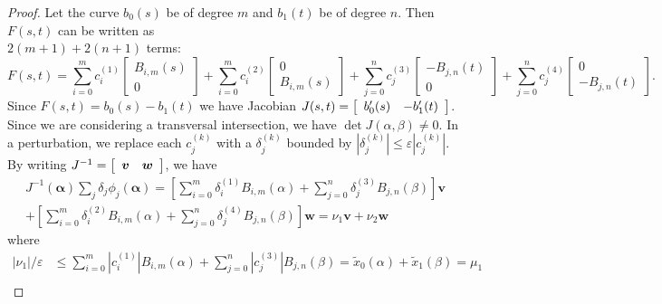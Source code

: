 \documentclass[3p, authoryear, square]{elsarticle}
\theoremstyle{definition}
\newcommand{\eps}{\varepsilon}
\begin{document}
\begin{proof}
Let the curve \(b_0(s)\) be of degree \(m\) and \(b_1(t)\) be of degree \(n\).
Then \(F(s, t)\) can be written as \\ \(2(m + 1) + 2(n + 1)\) terms:
\begin{equation}
F(s, t) =
  \sum_{i = 0}^m c_i^{(1)} \left[ \begin{array}{c}
  B_{i, m}(s) \\ 0 \end{array}\right] +
  \sum_{i = 0}^m c_i^{(2)} \left[ \begin{array}{c}
  0 \\ B_{i, m}(s) \end{array}\right] +
  \sum_{j = 0}^n c_j^{(3)} \left[ \begin{array}{c}
  -B_{j, n}(t) \\ 0 \end{array}\right] +
  \sum_{j = 0}^n c_j^{(4)} \left[ \begin{array}{c}
  0 \\ -B_{j, n}(t) \end{array}\right].
\end{equation}
Since \(F(s, t) = b_0(s) - b_1(t)\) we have Jacobian \(J(s, t) =
\left[ \begin{array}{c c} b_0'(s) & -b_1'(t) \end{array}\right]\). Since we
are considering a transversal intersection, we have
\(\det J(\alpha, \beta) \neq 0\). In a perturbation, we replace each
\(c_j^{(k)}\) with a \(\delta_j^{(k)}\) bounded by
\(\left|\delta_j^{(k)}\right| \leq \eps \left|c_j^{(k)}\right|\).
By writing \(J^{-1} = \left[ \begin{array}{c c}
\bm{v} & \bm{w} \end{array}\right]\), we have
\begin{multline}
J^{-1}\left(\bm{\alpha}\right) \sum_j \delta_j
  \phi_j\left(\bm{\alpha}\right) =
  \left[\sum_{i = 0}^m \delta_i^{(1)} B_{i, m}(\alpha) +
  \sum_{j = 0}^n \delta_j^{(3)} B_{j, n}(\beta)\right] \bm{v} \\
  + \left[\sum_{i = 0}^m \delta_i^{(2)} B_{i, m}(\alpha) +
  \sum_{j = 0}^n \delta_j^{(4)} B_{j, n}(\beta)\right] \bm{w} =
  \nu_1 \bm{v} + \nu_2 \bm{w}
\end{multline}
where
\begin{align}
\left|\nu_1\right| / \eps &\leq \sum_{i = 0}^m
  \left|c_{i}^{(1)}\right| B_{i, m}\left(\alpha\right) + \sum_{j = 0}^n
  \left|c_{j}^{(3)}\right| B_{j, n}\left(\beta\right) =
  \widetilde{x}_0(\alpha) + \widetilde{x}_1(\beta) = \mu_1 \\

\end{align}
\end{proof}
\end{document}
